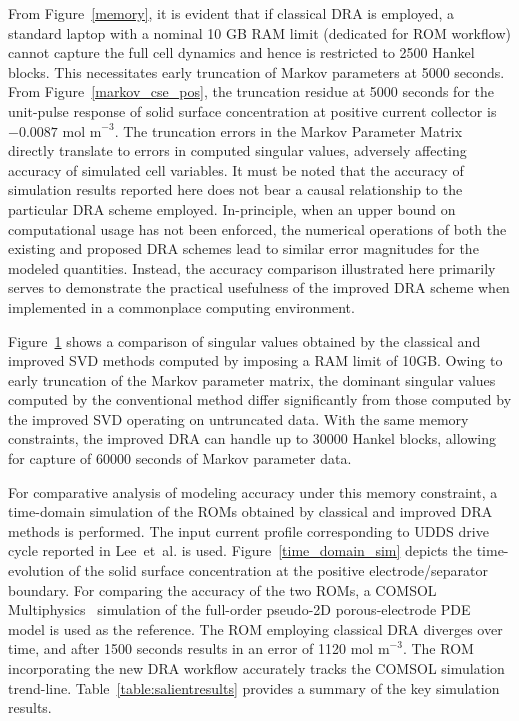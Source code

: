 From Figure~\ref{memory}, it is evident that if classical DRA
is employed, a standard laptop with a nominal 10 GB RAM limit (dedicated
for ROM workflow) cannot capture the full cell dynamics and hence
is restricted to 2500 Hankel blocks. This necessitates early truncation
of Markov parameters at 5000 seconds. From Figure~\ref{markov_cse_pos},
the truncation residue at 5000 seconds for the unit-pulse response
of solid surface concentration at positive current collector is $-0.0087 \text{ mol m}^{-\text{3}}$.
The truncation errors in the Markov Parameter Matrix directly translate
to errors in computed singular values, adversely affecting accuracy
of simulated cell variables. It must be noted that the accuracy of
simulation results reported here does not bear a causal relationship
to the particular DRA scheme employed. In-principle, when an upper
bound on computational usage has not been enforced, the numerical
operations of both the existing and proposed DRA schemes lead to similar
error magnitudes for the modeled quantities. Instead, the accuracy
comparison illustrated here primarily serves to demonstrate the practical
usefulness of the improved DRA scheme when implemented in a commonplace
computing environment.

\begin{figure}
	\caption{}
	\label{truncated}
\end{figure}

Figure~\ref{truncated} shows a comparison of singular values obtained
by the classical and improved SVD methods computed by imposing a RAM
limit of 10GB. Owing to early truncation of the Markov parameter matrix,
the dominant singular values computed by the conventional method differ
significantly from those computed by the improved SVD operating on
untruncated data. With the same memory constraints, the improved DRA
can handle up to 30000 Hankel blocks, allowing for capture of 60000
seconds of Markov parameter data.

For comparative analysis of modeling accuracy under this memory constraint,
a time-domain simulation of the ROMs obtained by classical and improved
DRA methods is performed. The input current profile corresponding
to UDDS drive cycle reported in Lee~et~al. \citep{LeeChemistruckPlett2012}
is used. Figure~\ref{time_domain_sim} depicts the time-evolution
of the solid surface concentration at the positive electrode/separator
boundary. For comparing the accuracy of the two ROMs, a COMSOL Multiphysics~\citep{Multiphysics2012}
simulation of the full-order pseudo-2D porous-electrode PDE model
is used as the reference. The ROM employing classical DRA diverges
over time, and after 1500 seconds results in an error of 1120$\text{ mol m}^{-\text{3}}$$.$
The ROM incorporating the new DRA workflow accurately tracks the COMSOL
simulation trend-line. Table~\ref{table:salientresults} provides
a summary of the key simulation results.

